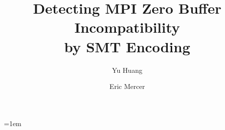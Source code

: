 \documentclass[conference]{llncs}
\begin{document}
\title{Detecting MPI Zero Buffer Incompatibility\\ by SMT Encoding}

\author{Yu Huang \and Eric Mercer}

\maketitle
%
%
\emergencystretch=1em

\begin{abstract} 

\end{abstract}








%
%






\end{document}
